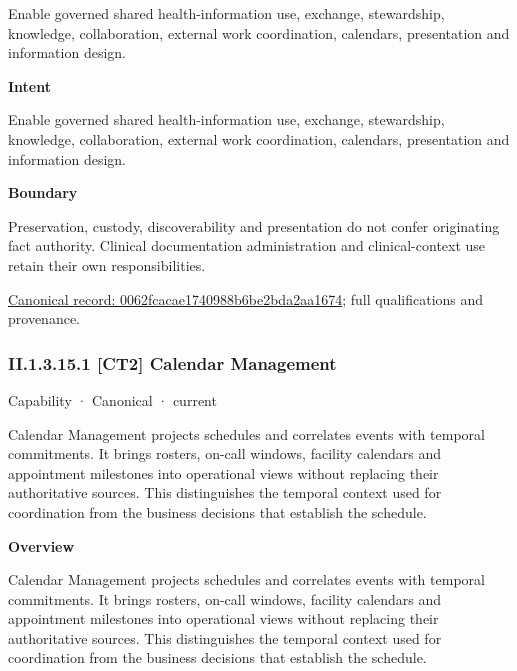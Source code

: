 Enable governed shared health-information use, exchange, stewardship, knowledge, collaboration, external work coordination, calendars, presentation and information design.



\textbf{Intent}



Enable governed shared health-information use, exchange, stewardship, knowledge, collaboration, external work coordination, calendars, presentation and information design.



\textbf{Boundary}



Preservation, custody, discoverability and presentation do not confer originating fact authority. Clinical documentation administration and clinical-context use retain their own responsibilities.


{\footnotesize \href{../../../../continuum/strategy/capability/0062fcacae1740988b6be2bda2aa1674.md}{Canonical record: 0062fcacae1740988b6be2bda2aa1674}; full qualifications and provenance.}\par
\subsubsection*{II.1.3.15.1 [CT2] Calendar Management}
\label{navigation:II.1.3.15.1}

\label{element:7669036f7e6749219412fc64df5f7064}
{\small Capability · Canonical · current}\par

Calendar Management projects schedules and correlates events with temporal commitments. It brings rosters, on-call windows, facility calendars and appointment milestones into operational views without replacing their authoritative sources. This distinguishes the temporal context used for coordination from the business decisions that establish the schedule.



\textbf{Overview}



Calendar Management projects schedules and correlates events with temporal commitments. It brings rosters, on-call windows, facility calendars and appointment milestones into operational views without replacing their authoritative sources. This distinguishes the temporal context used for coordination from the business decisions that establish the schedule.



